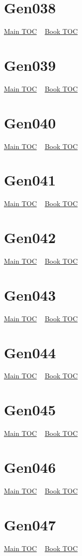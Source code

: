 \documentclass{book}
\begin{document}
  \section{Gen038}\hyperlink{toc}{Main TOC} ~ \hyperref[subsec:Gen]{Book TOC} 
  \section{Gen039}\hyperlink{toc}{Main TOC} ~ \hyperref[subsec:Gen]{Book TOC} 
  \section{Gen040}\hyperlink{toc}{Main TOC} ~ \hyperref[subsec:Gen]{Book TOC} 
  \section{Gen041}\hyperlink{toc}{Main TOC} ~ \hyperref[subsec:Gen]{Book TOC} 
  \section{Gen042}\hyperlink{toc}{Main TOC} ~ \hyperref[subsec:Gen]{Book TOC} 
  \section{Gen043}\hyperlink{toc}{Main TOC} ~ \hyperref[subsec:Gen]{Book TOC} 
  \section{Gen044}\hyperlink{toc}{Main TOC} ~ \hyperref[subsec:Gen]{Book TOC} 
  \section{Gen045}\hyperlink{toc}{Main TOC} ~ \hyperref[subsec:Gen]{Book TOC} 
  \section{Gen046}\hyperlink{toc}{Main TOC} ~ \hyperref[subsec:Gen]{Book TOC} 
  \section{Gen047}\hyperlink{toc}{Main TOC} ~ \hyperref[subsec:Gen]{Book TOC} 
\end{document}
